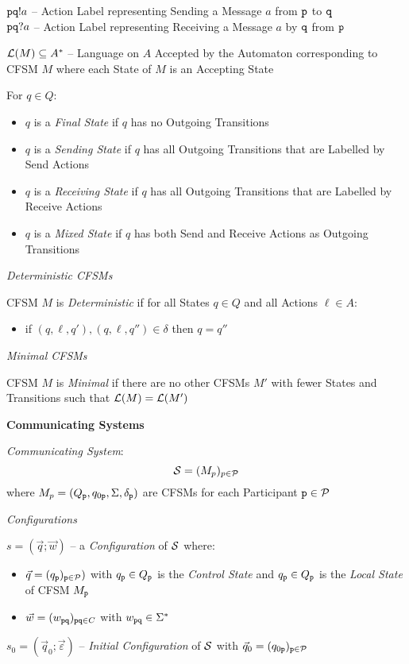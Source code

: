 $\mathtt{pq}!a$ -- Action Label representing Sending a Message $a$ from
$\mathtt{p}$ to $\mathtt{q}$ \\
$\mathtt{pq}?a$ -- Action Label representing Receiving a Message $a$ by
$\mathtt{q}$ from $\mathtt{p}$

$\mathcal{L}(M) \subseteq A^*$ -- Language on $A$ Accepted by the
Automaton corresponding to CFSM $M$ where each State of $M$ is an
Accepting State %

For $q \in Q$:
\begin{itemize}
  \item $q$ is a \emph{Final State} if $q$ has no Outgoing Transitions
  \item $q$ is a \emph{Sending State} if $q$ has all Outgoing
    Transitions that are Labelled by Send Actions
  \item $q$ is a \emph{Receiving State} if $q$ has all Outgoing
    Transitions that are Labelled by Receive Actions
  \item $q$ is a \emph{Mixed State} if $q$ has both Send and
    Receive Actions as Outgoing Transitions
\end{itemize}

\emph{Deterministic CFSMs}

CFSM $M$ is \emph{Deterministic} if for all States $q \in Q$ and all
Actions $\ell \in A$:
\begin{itemize}
  \item if $(q,\ell,q'),(q,\ell,q'') \in \delta$ then $q = q''$
\end{itemize}

\emph{Minimal CFSMs}

CFSM $M$ is \emph{Minimal} if there are no other CFSMs $M'$ with fewer
States and Transitions such that $\mathcal{L}(M) = \mathcal{L}(M')$


\textbf{Communicating Systems}

\emph{Communicating System}:
\[
  \mathcal{S} = (M_p)_{p \in \mathcal{P}}
\]
where $M_p = (Q_\mathtt{p}, q_{0\mathtt{p}}, \Sigma, \delta_\mathtt{p})$
are CFSMs for each Participant $\mathtt{p} \in \mathcal{P}$

\emph{Configurations}

$s = (\vec{q};\vec{w})$ -- a \emph{Configuration} of $\mathcal{S}$
where:
\begin{itemize}
  \item $\vec{q} = (q_\mathtt{p})_{\mathtt{p} \in \mathcal{P}})$ with
    $q_\mathtt{p} \in Q_\mathtt{p}$ is the \emph{Control State} and
    $q_\mathtt{p} \in Q_\mathtt{p}$ is the \emph{Local State} of CFSM
    $M_\mathtt{p}$
  \item $\vec{w} = (w_\mathtt{pq})_{\mathtt{pq} \in C}$ with
    $w_\mathtt{pq} \in \Sigma^*$
\end{itemize}
$s_0 = (\vec{q}_0;\vec{\varepsilon})$ -- \emph{Initial Configuration}
of $\mathcal{S}$ with $\vec{q}_0 = (q_{0\mathtt{p}})_{\mathtt{p} \in
  \mathcal{P}}$


